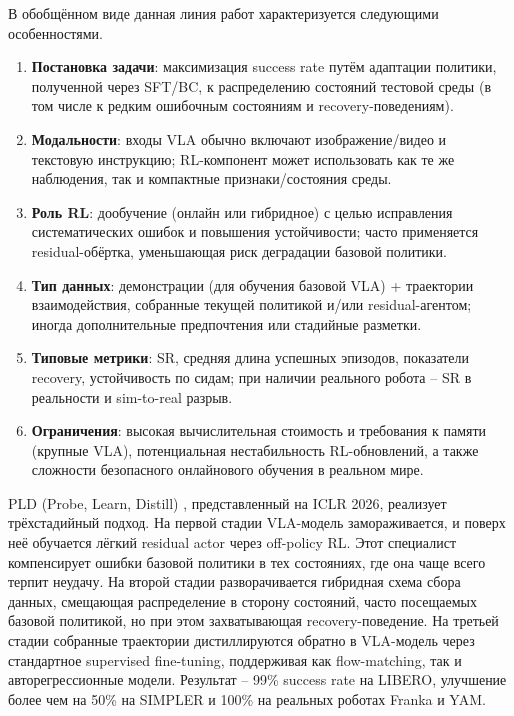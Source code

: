     В обобщённом виде данная линия работ характеризуется следующими особенностями.
    \begin{enumerate}
        \item \textbf{Постановка задачи}: максимизация success rate путём адаптации политики, полученной через SFT/BC, к распределению состояний тестовой среды (в том числе к редким ошибочным состояниям и recovery-поведениям).
        \item \textbf{Модальности}: входы VLA обычно включают изображение/видео и текстовую инструкцию; RL-компонент может использовать как те же наблюдения, так и компактные признаки/состояния среды.
        \item \textbf{Роль RL}: дообучение (онлайн или гибридное) с целью исправления систематических ошибок и повышения устойчивости; часто применяется residual-обёртка, уменьшающая риск деградации базовой политики.
        \item \textbf{Тип данных}: демонстрации (для обучения базовой VLA) + траектории взаимодействия, собранные текущей политикой и/или residual-агентом; иногда дополнительные предпочтения или стадийные разметки.
        \item \textbf{Типовые метрики}: SR, средняя длина успешных эпизодов, показатели recovery, устойчивость по сидам; при наличии реального робота -- SR в реальности и sim-to-real разрыв.
        \item \textbf{Ограничения}: высокая вычислительная стоимость и требования к памяти (крупные VLA), потенциальная нестабильность RL-обновлений, а также сложности безопасного онлайнового обучения в реальном мире.
    \end{enumerate}

    PLD (Probe, Learn, Distill) \cite{pld2026}, представленный на ICLR 2026, реализует трёхстадийный подход. На первой стадии VLA-модель замораживается, и поверх неё обучается лёгкий residual actor через off-policy RL. Этот специалист компенсирует ошибки базовой политики в тех состояниях, где она чаще всего терпит неудачу. На второй стадии разворачивается гибридная схема сбора данных, смещающая распределение в сторону состояний, часто посещаемых базовой политикой, но при этом захватывающая recovery-поведение. На третьей стадии собранные траектории дистиллируются обратно в VLA-модель через стандартное supervised fine-tuning, поддерживая как flow-matching, так и авторегрессионные модели. Результат -- 99\% success rate на LIBERO, улучшение более чем на 50\% на SIMPLER и 100\% на реальных роботах Franka и YAM.

